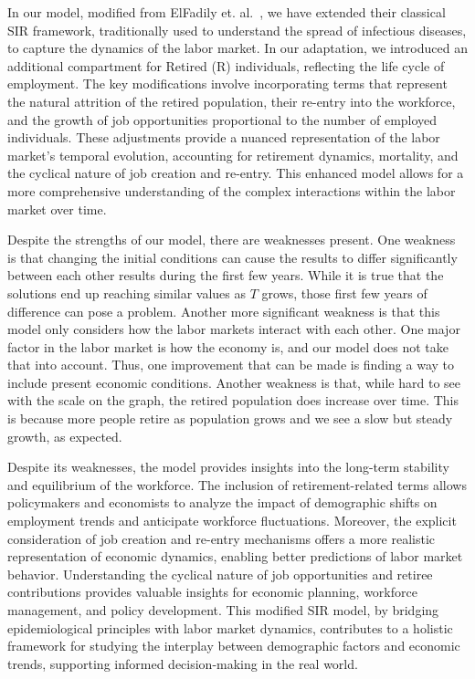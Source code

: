 \documentclass[11pt]{amsart}
\begin{document}
In our model, modified from ElFadily et. al.~\cite{ElFadily}, we have extended their classical SIR framework, traditionally 
used to understand the spread of infectious diseases, to capture the dynamics of the labor market. In our adaptation, 
we introduced an additional compartment for Retired (R) individuals, reflecting the life cycle of employment. The key 
modifications involve incorporating terms that represent the natural attrition of the retired population, their re-entry into 
the workforce, and the growth of job opportunities proportional to the number of employed individuals. These adjustments provide 
a nuanced representation of the labor market's temporal evolution, accounting for retirement dynamics, mortality, and the cyclical 
nature of job creation and re-entry. This enhanced model allows for a more comprehensive understanding of the complex interactions 
within the labor market over time.

Despite the strengths of our model, there are weaknesses present. One weakness is that changing the initial conditions can cause 
the results to differ significantly between each other results during the first few years. While it is true that the solutions 
end up reaching similar values as $T$ grows, those first few years of difference can pose a problem. Another more significant 
weakness is that this model only considers how the labor markets interact with each other. One major factor in the labor market 
is how the economy is, and our model does not take that into account. Thus, one improvement that can be made is finding a way to 
include present economic conditions. Another weakness is that, while hard to see with the scale on the graph, the retired population 
does increase over time. This is because more people retire as population grows and we see a slow but steady growth, as expected.

Despite its weaknesses, the model provides insights into the long-term stability and equilibrium of the workforce. 
The inclusion of retirement-related terms allows policymakers and economists to analyze the impact of demographic shifts on employment trends and anticipate 
workforce fluctuations. Moreover, the explicit consideration of job creation and re-entry mechanisms offers a more realistic representation of economic dynamics, 
enabling better predictions of labor market behavior. Understanding the cyclical nature of job opportunities and retiree contributions provides valuable insights 
for economic planning, workforce management, and policy development. This modified SIR model, by bridging epidemiological principles with labor market dynamics, 
contributes to a holistic framework for studying the interplay between demographic factors and economic trends, supporting informed decision-making in the real world.



\newpage 


\end{document}
